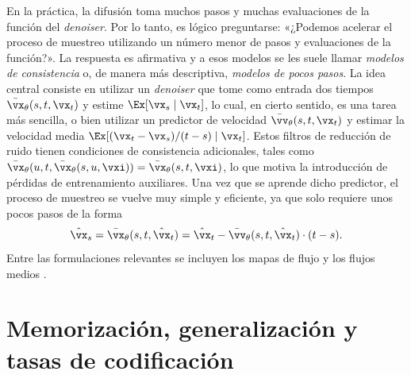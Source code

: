 \documentclass[../../book-main.tex]{subfiles}
\begin{document}
\begin{remark}
    En la práctica, la difusión toma muchos pasos y muchas evaluaciones
    de la función del \textit{denoiser}. Por lo tanto, es lógico preguntarse:
    «¿Podemos acelerar el proceso de muestreo utilizando un número menor
    de pasos y evaluaciones de la función?». La respuesta es afirmativa y a esos
    modelos se les suele llamar \textit{modelos de consistencia} o, de manera más
    descriptiva, \textit{modelos de pocos pasos}. La idea central consiste en utilizar un
    \textit{denoiser} que tome como entrada dos tiempos \(\bar{\vx}_{\theta}(s, t,
    \vx_{t})\) y estime \(\Ex[\vx_{s} \mid \vx_{t}]\), lo cual, en
    cierto sentido, es una tarea más sencilla, o bien utilizar un predictor de velocidad
    \(\bar{\vv}_{\theta}(s, t, \vx_{t})\) y estimar la velocidad media
    \(\Ex[(\vx_{t} - \vx_{s})/(t - s) \mid \vx_{t}]\). Estos
    filtros de reducción de ruido tienen condiciones de consistencia
    adicionales, tales como \(\bar{\vx}_{\theta}(u, t,
    \bar{\vx}_{\theta}(s, u, \vxi)) = \bar{\vx}_{\theta}(s, t, \vxi)\),
    lo que motiva la introducción de pérdidas de entrenamiento auxiliares. 
    Una vez que se aprende dicho predictor, el proceso de muestreo se vuelve 
    muy simple y eficiente, ya que solo requiere unos pocos pasos de la forma
    \begin{equation}
        \hat{\vx}_{s} = \bar{\vx}_{\theta}(s, t, \hat{\vx}_{t}) =
        \hat{\vx}_{t} - \bar{\vv}_{\theta}(s, t, \hat{\vx}_{t})\cdot(t - s).
    \end{equation}
    Entre las formulaciones relevantes se incluyen los mapas de flujo \cite{boffi2025build} y
    los flujos medios \cite{geng2025mean}.
\end{remark}

\section{Memorización, generalización y tasas de codificación}
\label{sec:diffusion_memorization}
\end{document}
